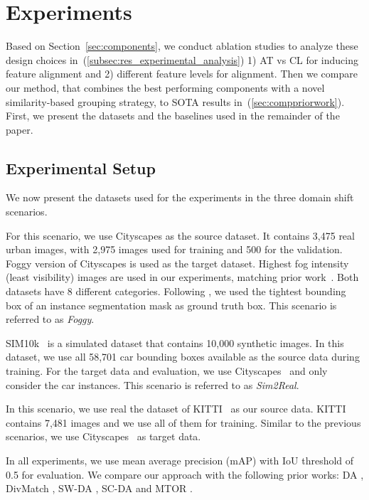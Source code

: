 \documentclass[10pt,twocolumn,letterpaper]{article}
\DeclareRobustCommand{\secref}[1]{Section~\ref{#1}}
\begin{document}
\section{Experiments}
\label{sec:analysis}
Based on \secref{sec:components}, 
we conduct ablation studies to analyze these design choices in~(\ref{subsec:res_experimental_analysis}) 1) AT vs CL for inducing feature alignment and 2) different feature levels for alignment. Then we compare our method, that combines the best performing components with a novel similarity-based grouping strategy, to SOTA results in~(\ref{sec:comppriorwork}). First, we present the datasets and the baselines used in the remainder of the paper.

\subsection{Experimental Setup}
\label{sec:expsetup}
We now present the datasets used for the experiments in the three domain shift scenarios. 


 For this scenario, we use Cityscapes \cite{city} as the source dataset. It contains 3,475 real urban images, with 2,975 images used for training and 500 for the validation. Foggy version of Cityscapes \cite{foggy} is used as the target dataset. 
Highest fog intensity (least visibility) images are used in our experiments, matching prior work~\cite{GPA}. 
Both datasets have 8 different categories. 
Following \cite{da_faster_rcnn}, we used the tightest bounding box of an instance segmentation mask as ground truth box. This scenario is referred to as \emph{Foggy}.

 SIM10k~\cite{sim10k} is a simulated dataset that contains  10,000 synthetic images. In this dataset, we use all 58,701 car bounding boxes available as the source data during training. For the target data and evaluation, we use Cityscapes~\cite{city} and only consider the car instances. This scenario is referred to as \emph{Sim2Real}.

 In this scenario, we use real the dataset of KITTI~\cite{kitti} as our source data. KITTI contains 7,481 images and we use all of them for training. Similar to the previous scenarios, we use Cityscapes~\cite{city} as target data. 

In all experiments, we use mean average precision (mAP) with IoU threshold of 0.5 for evaluation. We compare our approach with the following prior works: DA \cite{da_faster_rcnn}, DivMatch \cite{diversify_and_match}, SW-DA \cite{strong-weak}, SC-DA \cite{zhu_cvpr19_selective_alignment} and MTOR \cite{mean_teacher}. 
\end{document}
